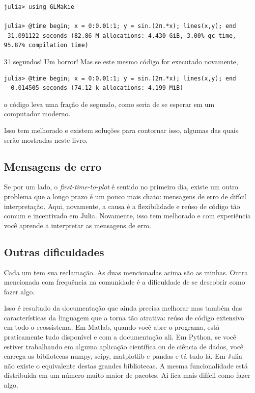 \documentclass[
  notoc %
]{tufte-book}
\begin{document}
\begin{lstlisting}
julia> using GLMakie

julia> @time begin; x = 0:0.01:1; y = sin.(2π.*x); lines(x,y); end
 31.091122 seconds (82.86 M allocations: 4.430 GiB, 3.00% gc time, 95.87% compilation time)
\end{lstlisting}

31 segundos! Um horror! Mas se este mesmo código for executado
novamente,

\begin{lstlisting}
julia> @time begin; x = 0:0.01:1; y = sin.(2π.*x); lines(x,y); end
  0.014505 seconds (74.12 k allocations: 4.199 MiB)
\end{lstlisting}

o código leva uma fração de segundo, como seria de se esperar em um
computador moderno.

Isso tem melhorado e existem soluções para contornar isso, algumas das
quais serão mostradas neste livro.

\hypertarget{mensagens-de-erro}{%
\subsection{Mensagens de erro}\label{mensagens-de-erro}}

Se por um lado, o \emph{first-time-to-plot} é sentido no primeiro dia,
existe um outro problema que a longo prazo é um pouco mais chato:
mensagens de erro de difícil interpretação. Aqui, novamente, a causa é a
flexibilidade e reúso de código tão comum e incentivado em Julia.
Novamente, isso tem melhorado e com experiência você aprende a
interpretar as mensagens de erro.

\hypertarget{outras-dificuldades}{%
\subsection{Outras dificuldades}\label{outras-dificuldades}}

Cada um tem sua reclamação. As duas mencionadas acima são as minhas.
Outra mencionada com frequência na comunidade é a dificuldade de se
descobrir como fazer algo.

Isso é resultado da documentação que ainda precisa melhorar mas também
das características da linguagem que a torna tão atrativa: reúso de
código extensivo em todo o ecossistema. Em Matlab, quando você abre o
programa, está praticamente tudo disponível e com a documentação ali. Em
Python, se você estiver trabalhando em alguma aplicação científica ou de
ciência de dados, você carrega as bibliotecas numpy, scipy, matplotlib e
pandas e tá tudo lá. Em Julia não existe o equivalente destas grandes
bibliotecas. A mesma funcionalidade está distribuída em um número muito
maior de pacotes. Aí fica mais difícil como fazer algo.
\end{document}
